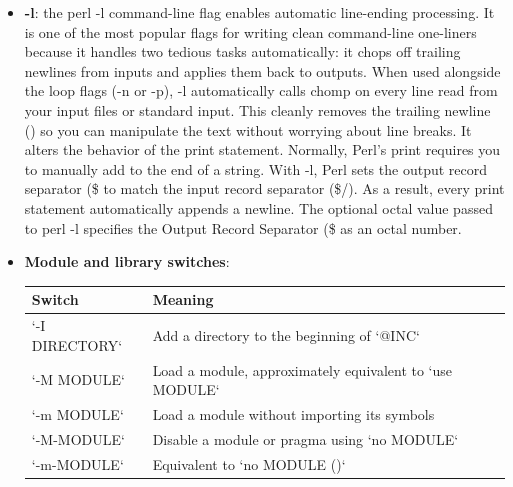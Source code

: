 \documentclass{report}
\begin{document}
\begin{itemize}
            \bigbreak \noindent 
            If you pass a switch without a value, Perl creates a variable and sets it to 1 (true). If you use an equals sign (=), Perl sets the variable to whatever follows it.
        \item \textbf{-l}: the perl -l command-line flag enables automatic line-ending processing.
            \bigbreak \noindent 
            It is one of the most popular flags for writing clean command-line one-liners because it handles two tedious tasks automatically: it chops off trailing newlines from inputs and applies them back to outputs.
            \bigbreak \noindent 
            When used alongside the loop flags (-n or -p), -l automatically calls chomp on every line read from your input files or standard input. This cleanly removes the trailing newline (\string\n) so you can manipulate the text without worrying about line breaks.
            \bigbreak \noindent 
            It alters the behavior of the print statement. Normally, Perl's print requires you to manually add \string\n\;to the end of a string. With -l, Perl sets the output record separator (\$\string\) to match the input record separator (\$/). As a result, every print statement automatically appends a newline.
            \bigbreak \noindent 
            The optional octal value passed to perl -l specifies the Output Record Separator (\$\string\) as an octal number.
        \item \textbf{Module and library switches}: 
            \begin{center}
                \begin{tabularx}{\textwidth}{@{}lX@{}}
                    \toprule
                    \textbf{Switch} & \textbf{Meaning} \\
                    \midrule
                    `-I DIRECTORY` & Add a directory to the beginning of `@INC` \\[2ex]
                    `-M MODULE` & Load a module, approximately equivalent to `use MODULE` \\[2ex]
                    `-m MODULE` & Load a module without importing its symbols \\[2ex]
                    `-M-MODULE` & Disable a module or pragma using `no MODULE` \\[2ex]
                    `-m-MODULE` & Equivalent to `no MODULE ()` \\
                    \bottomrule
                \end{tabularx}
            \end{center}

\end{itemize}
\end{document}
